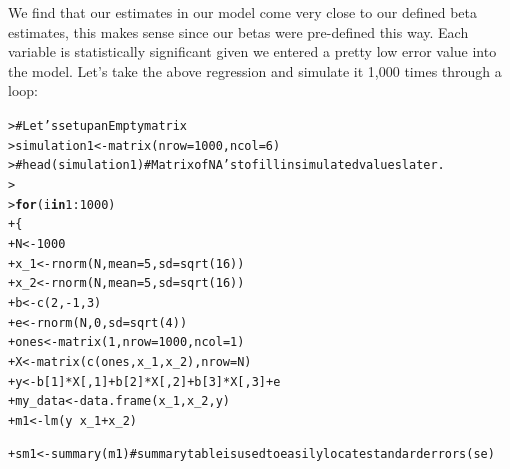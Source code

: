 \documentclass[12pt]{article}\usepackage[]{graphicx}\usepackage[]{color}
\makeatletter
\newcommand{\hlnum}[1]{\textcolor[rgb]{0.82,0.78,0.62}{#1}}%
\newcommand{\hlcom}[1]{\textcolor[rgb]{0.404,0.408,0.42}{#1}}%
\newcommand{\hlopt}[1]{\textcolor[rgb]{0.882,0.878,0.898}{#1}}%
\newcommand{\hlstd}[1]{\textcolor[rgb]{0.882,0.878,0.898}{#1}}%
\newcommand{\hlkwa}[1]{\textcolor[rgb]{0.384,0.675,0.808}{\textbf{#1}}}%
\newcommand{\hlkwb}[1]{\textcolor[rgb]{0.902,0.675,0.196}{#1}}%
\newcommand{\hlkwc}[1]{\textcolor[rgb]{0.812,0.522,0.388}{#1}}%
\newcommand{\hlkwd}[1]{\textcolor[rgb]{0.733,0.388,0.812}{#1}}%
\newenvironment{kframe}{%
 \def\at@end@of@kframe{}%
 \ifinner\ifhmode%
  \def\at@end@of@kframe{\end{minipage}}%
  \begin{minipage}{\columnwidth}%
 \fi\fi%
 \def\FrameCommand##1{\hskip\@totalleftmargin \hskip-\fboxsep
 \colorbox{shadecolor}{##1}\hskip-\fboxsep
     \hskip-\linewidth \hskip-\@totalleftmargin \hskip\columnwidth}%
 \MakeFramed {\advance\hsize-\width
   \@totalleftmargin\z@ \linewidth\hsize
   \@setminipage}}%
 {\par\unskip\endMakeFramed%
 \at@end@of@kframe}
\newenvironment{knitrout}{}{} %
\makeatother
\begin{document}
\begin{flushleft}
We find that our estimates in our model come very close to our defined beta estimates, this makes sense since our betas were pre-defined this way. Each variable is statistically significant given we entered a pretty low error value into the model. Let's take the above regression and simulate it 1,000 times through a loop:

\begin{knitrout}
\color{fgcolor}\begin{kframe}
\begin{alltt}
\hlstd{> }\hlcom{# Let's set up an Empty matrix}
\hlstd{> }\hlstd{simulation1} \hlkwb{<-} \hlkwd{matrix}\hlstd{(}\hlkwc{nrow} \hlstd{=} \hlnum{1000}\hlstd{,} \hlkwc{ncol} \hlstd{=} \hlnum{6}\hlstd{)}
\hlstd{> }\hlcom{# head(simulation1)  # Matrix of NA's to fill in simulated values later.}
\hlstd{> }
\hlstd{> }\hlkwa{for} \hlstd{(i} \hlkwa{in} \hlnum{1}\hlopt{:}\hlnum{1000}\hlstd{)}
\hlstd{+ }\hlstd{\{}
\hlstd{+ }  \hlstd{N} \hlkwb{<-} \hlnum{1000}
\hlstd{+ }  \hlstd{x_1} \hlkwb{<-} \hlkwd{rnorm}\hlstd{(N,} \hlkwc{mean}\hlstd{=}\hlnum{5}\hlstd{,} \hlkwc{sd}\hlstd{=}\hlkwd{sqrt}\hlstd{(}\hlnum{16}\hlstd{))}
\hlstd{+ }  \hlstd{x_2} \hlkwb{<-} \hlkwd{rnorm}\hlstd{(N,} \hlkwc{mean}\hlstd{=}\hlnum{5}\hlstd{,} \hlkwc{sd}\hlstd{=}\hlkwd{sqrt}\hlstd{(}\hlnum{16}\hlstd{))}
\hlstd{+ }  \hlstd{b} \hlkwb{<-} \hlkwd{c}\hlstd{(}\hlnum{2}\hlstd{,} \hlopt{-}\hlnum{1}\hlstd{,} \hlnum{3}\hlstd{)}
\hlstd{+ }  \hlstd{e} \hlkwb{<-} \hlkwd{rnorm}\hlstd{(N,} \hlnum{0}\hlstd{,} \hlkwc{sd}\hlstd{=}\hlkwd{sqrt}\hlstd{(}\hlnum{4}\hlstd{))}
\hlstd{+ }  \hlstd{ones} \hlkwb{<-} \hlkwd{matrix}\hlstd{(}\hlnum{1}\hlstd{,} \hlkwc{nrow}\hlstd{=}\hlnum{1000}\hlstd{,} \hlkwc{ncol}\hlstd{=}\hlnum{1}\hlstd{)}
\hlstd{+ }  \hlstd{X} \hlkwb{<-} \hlkwd{matrix}\hlstd{(}\hlkwd{c}\hlstd{(ones, x_1, x_2),} \hlkwc{nrow}\hlstd{=N)}
\hlstd{+ }  \hlstd{y} \hlkwb{<-} \hlstd{b[}\hlnum{1}\hlstd{]}\hlopt{*}\hlstd{X[,}\hlnum{1}\hlstd{]}\hlopt{+} \hlstd{b[}\hlnum{2}\hlstd{]}\hlopt{*}\hlstd{X[,}\hlnum{2}\hlstd{]}\hlopt{+} \hlstd{b[}\hlnum{3}\hlstd{]}\hlopt{*}\hlstd{X[,}\hlnum{3}\hlstd{]} \hlopt{+} \hlstd{e}
\hlstd{+ }  \hlstd{my_data} \hlkwb{<-} \hlkwd{data.frame}\hlstd{(x_1, x_2, y)}
\hlstd{+ }  \hlstd{m1} \hlkwb{<-} \hlkwd{lm}\hlstd{(y} \hlopt{~} \hlstd{x_1} \hlopt{+} \hlstd{x_2)}

\hlstd{+ }  \hlstd{sm1} \hlkwb{<-} \hlkwd{summary}\hlstd{(m1)}  \hlcom{# summary table is used to easily locate standard errors (se)}


\end{alltt}
\end{kframe}
\end{knitrout}
\end{flushleft}
\end{document}
